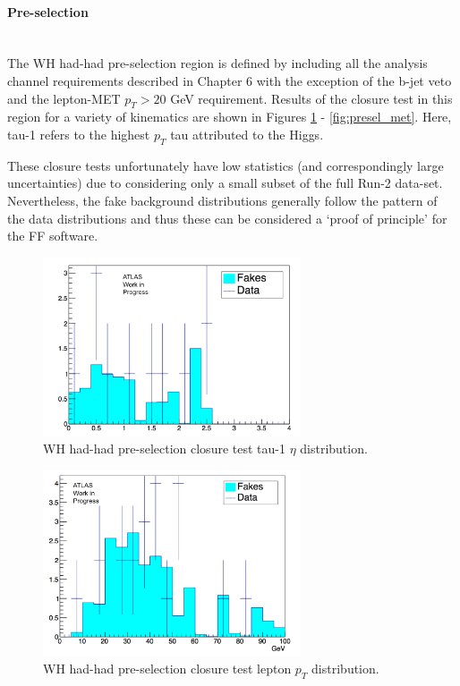 \paragraph{Pre-selection}\mbox{} \\
The WH had-had pre-selection region is defined by including all the analysis channel requirements described in Chapter 6 with the exception of the b-jet veto and the lepton-MET $p_T>20$ GeV requirement. Results of the closure test in this region for a variety of kinematics are shown in Figures \ref{fig:presel_taueta} - \ref{fig:presel_met}. Here, tau-1 refers to the highest $p_T$ tau attributed to the Higgs.

These closure tests unfortunately have low statistics (and correspondingly large uncertainties) due to considering only a small subset of the full Run-2 data-set.  Nevertheless, the fake background distributions generally follow the pattern of the data distributions and thus these can be considered a `proof of principle' for the FF software.

\begin{figure}[htb!]
    \centering
    \includegraphics[width=3in]{figures/chapter7/tau1_eta_whpresel.png}
    \caption{WH had-had pre-selection closure test tau-1 $\eta$ distribution.}
    \label{fig:presel_taueta}
\end{figure}

\begin{figure}[htb!]
    \centering
    \includegraphics[width=3in]{figures/chapter7/lep_pt_wh_presel.png}
    \caption{WH had-had pre-selection closure test lepton $p_T$ distribution.}
    \label{fig:presel_leppt}
\end{figure}

